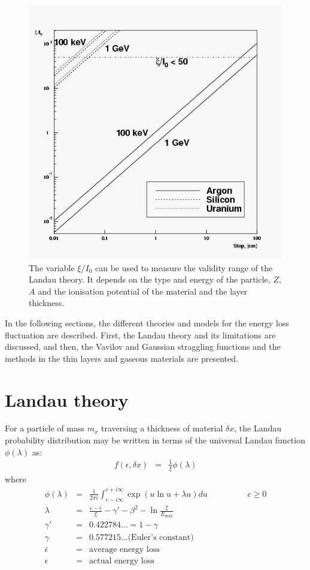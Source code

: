 \documentclass{article}
\newcommand{\Emax}{\ensuremath{E_{\mathrm{max}}}}
\begin{document}
\begin{figure}
   \centering
   \includegraphics[width=.6\linewidth]{phys1}
   \caption{The variable $\xi/I_0$ can be used to measure the 
            validity range of the Landau theory. It depends
            on the type and energy of the particle, $Z$, $A$
            and the ionisation potential of the material and
            the layer thickness. 
            }
    \label{fg:phys332-1}
\end{figure}

In the following sections, the different theories and models for the
energy loss fluctuation are described. First, the Landau theory and
its limitations are discussed, and then, the Vavilov and Gaussian
straggling functions and the methods in the thin layers and gaseous
materials are presented.

\section{Landau theory}
\label{sec:phys332-1}

For a particle of mass $m_x$ traversing a thickness of material
$\delta x $, the Landau probability distribution may be written in
terms of the universal Landau function $\phi(\lambda)$
as\cite{bib-LAND}:
\begin{eqnarray*}
f( \epsilon , \delta x ) & = &\frac{1}{\xi} \phi ( \lambda )    
\end{eqnarray*}
where
\begin{eqnarray*}
\phi(\lambda )& = & \frac{1} {2 \pi i}\int^{c+i\infty}_{c-i\infty}
\exp \left ( u \ln u + \lambda u \right ) du \hspace{2cm} c \geq 0 \\
\lambda       & = & \frac{\epsilon  -\bar{\epsilon} }{\xi}
  - \gamma' - \beta^2 - \ln \frac{\xi}{\Emax}          \\
\gamma' & = & 0.422784\dots = 1 - \gamma \\
\gamma             & = & 0.577215\dots \mbox{(Euler's constant)}   \\
\bar{\epsilon}  & = & \mbox{average energy loss}                    \\
\epsilon      & = & \mbox{actual energy loss}
\end{eqnarray*}
\end{document}
